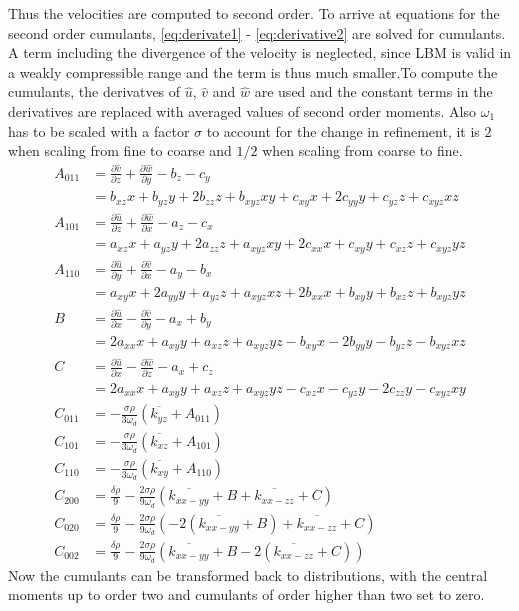 Thus the velocities are computed to second order. To arrive at equations for the second order cumulants, \eqref{eq:derivate1} - \eqref{eq:derivative2} are solved for cumulants. A term including the divergence of the velocity is neglected, since LBM is valid in a weakly compressible range and the term is thus much smaller.To compute the cumulants, the derivatves of $\hat{u}$, $\hat{v}$ and $\hat{w}$ are used and the constant terms in the derivatives are replaced with averaged values of second order moments. Also $\omega_1$ has to be scaled with a factor $\sigma$ to account for the change in refinement, it is $2$ when scaling from fine to coarse and $1/2$ when scaling from coarse to fine. 
\begin{align}
	A_{011} &= \frac{\partial \hat{v}}{\partial z} + \frac{\partial \hat{w}}{\partial y} - b_z - c_y \\
	&= b_{xz} x + b_{yz} y + 2 b_{zz} z + b_{xyz} xy + c_{xy} x + 2 c_{yy} y + c_{yz} z + c_{xyz} xz \\
	A_{101} &= \frac{\partial \hat{u}}{\partial z} + \frac{\partial \hat{w}}{\partial x} - a_z - c_x \\
	&= a_{xz} x + a_{yz} y + 2 a_{zz} z + a_{xyz} xy + 2 c_{xx} x + c_{xy} y + c_{xz} z + c_{xyz} yz \\
	A_{110} &= \frac{\partial \hat{u}}{\partial y} + \frac{\partial \hat{v}}{\partial x} - a_y - b_x \\
	&= a_{xy} x + 2 a_{yy} y + a_{yz} z + a_{xyz} xz + 2 b_{xx} x + b_{xy} y + b_{xz} z + b_{xyz} yz \\
	B &= \frac{\partial \hat{u}}{\partial x} - \frac{\partial \hat{v}}{\partial y} - a_x + b_y \\
	&= 2 a_{xx} x + a_{xy} y + a_{xz} z + a_{xyz} yz - b_{xy} x - 2 b_{yy} y - b_{yz} z - b_{xyz} xz \\
	C &= \frac{\partial \hat{u}}{\partial x} - \frac{\partial \hat{w}}{\partial z} - a_x + c_z \\
	&= 2 a_{xx} x + a_{xy} y + a_{xz} z + a_{xyz} yz - c_{xz} x - c_{yz} y - 2 c_{zz} y - c_{xyz} xy\\
	C_{011} &= - \frac{\sigma \rho}{3 \omega_d} \left( \overline{k_{yz}} + A_{011} \right)\\
	C_{101} &= - \frac{\sigma \rho}{3 \omega_d} \left( \overline{k_{xz}} + A_{101} \right) \\
	C_{110} &= - \frac{\sigma \rho}{3 \omega_d} \left( \overline{k_{xy}} + A_{110} \right) \\
	C_{200} &= \frac{\delta \rho}{9} - \frac{2 \sigma \rho}{9 \omega_d} \left( \overline{k_{xx-yy}} + B + \overline{k_{xx-zz}} + C \right) \\
	C_{020} &= \frac{\delta \rho}{9} - \frac{2 \sigma \rho}{9 \omega_d} \left( -2 \left(\overline{k_{xx-yy}} + B\right) + \overline{k_{xx-zz}} + C \right) \\
	C_{002} &= \frac{\delta \rho}{9} - \frac{2 \sigma \rho}{9 \omega_d} \left( \overline{k_{xx-yy}} + B - 2 \left( \overline{k_{xx-zz}} + C \right) \right)		
\end{align}
Now the cumulants can be transformed back to distributions, with the central moments up to order two and cumulants of order higher than two set to zero. 